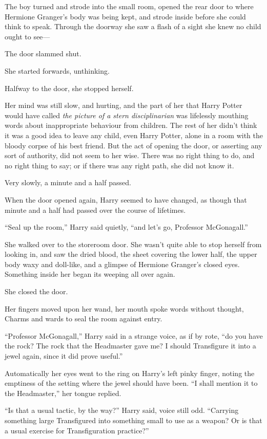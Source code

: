 The boy turned and strode into the small room, opened the rear door to where Hermione Granger’s body was being kept, and strode inside before she could think to speak. Through the doorway she saw a flash of a sight she knew no child ought to see—

The door slammed shut.

She started forwards, unthinking.

Halfway to the door, she stopped herself.

Her mind was still slow, and hurting, and the part of her that Harry Potter would have called \emph{the picture of a stern disciplinarian} was lifelessly mouthing words about inappropriate behaviour from children. The rest of her didn’t think it was a good idea to leave any child, even Harry Potter, alone in a room with the bloody corpse of his best friend. But the act of opening the door, or asserting any sort of authority, did not seem to her wise. There was no right thing to do, and no right thing to say; or if there was any right path, she did not know it.

Very slowly, a minute and a half passed.

\later

When the door opened again, Harry seemed to have changed, as though that minute and a half had passed over the course of lifetimes.

“Seal up the room,” Harry said quietly, “and let’s go, Professor McGonagall.”

She walked over to the storeroom door. She wasn’t quite able to stop herself from looking in, and saw the dried blood, the sheet covering the lower half, the upper body waxy and doll-like, and a glimpse of Hermione Granger’s closed eyes. Something inside her began its weeping all over again.

She closed the door.

Her fingers moved upon her wand, her mouth spoke words without thought, Charms and wards to seal the room against entry.

“Professor McGonagall,” Harry said in a strange voice, as if by rote, “do you have the rock? The rock that the Headmaster gave me? I should Transfigure it into a jewel again, since it did prove useful.”

Automatically her eyes went to the ring on Harry’s left pinky finger, noting the emptiness of the setting where the jewel should have been. “I shall mention it to the Headmaster,” her tongue replied.

“Is that a usual tactic, by the way?” Harry said, voice still odd. “Carrying something large Transfigured into something small to use as a weapon? Or is that a usual exercise for Transfiguration practice?”

